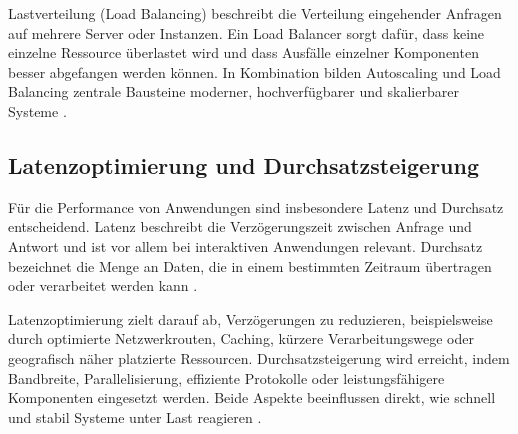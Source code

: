 Lastverteilung (Load Balancing) beschreibt die Verteilung eingehender Anfragen auf mehrere Server oder Instanzen. Ein Load Balancer sorgt dafür, dass keine einzelne Ressource überlastet wird und dass Ausfälle einzelner Komponenten besser abgefangen werden können. In Kombination bilden Autoscaling und Load Balancing zentrale Bausteine moderner, hochverfügbarer und skalierbarer Systeme \cite{teamtakt_devops_lastverteilung}.

\subsection{Latenzoptimierung und Durchsatzsteigerung}

Für die Performance von Anwendungen sind insbesondere Latenz und Durchsatz entscheidend. Latenz beschreibt die Verzögerungszeit zwischen Anfrage und Antwort und ist vor allem bei interaktiven Anwendungen relevant. Durchsatz bezeichnet die Menge an Daten, die in einem bestimmten Zeitraum übertragen oder verarbeitet werden kann \cite{studysmarter_latenz_durchsatz}.

Latenzoptimierung zielt darauf ab, Verzögerungen zu reduzieren, beispielsweise durch optimierte Netzwerkrouten, Caching, kürzere Verarbeitungswege oder geografisch näher platzierte Ressourcen. Durchsatzsteigerung wird erreicht, indem Bandbreite, Parallelisierung, effiziente Protokolle oder leistungsfähigere Komponenten eingesetzt werden. Beide Aspekte beeinflussen direkt, wie schnell und stabil Systeme unter Last reagieren \cite{studysmarter_latenz_durchsatz}.
